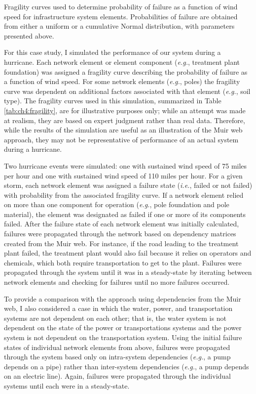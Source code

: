 \begin{table}
\caption[Fragility curves used to determine probability of failure.]{\label{tab:ch4:fragility}Fragility curves used to determine probability of failure as a function of wind speed for infrastructure system elements. Probabilities of failure are obtained from either a uniform or a cumulative Normal distribution, with parameters presented above.}

\end{table}


For this case study, I simulated the performance of our system during a hurricane. Each network element or element component (\emph{e.g.}, treatment plant foundation) was assigned a fragility curve describing the probability of failure as a function of wind speed.  For some network elements (\emph{e.g.}, poles) the fragility curve was dependent on additional factors associated with that element (\emph{e.g.}, soil type).  The fragility curves used in this simulation, summarized in Table \ref{tab:ch4:fragility}, are for illustrative purposes only; while an attempt was made at realism, they are based on expert judgment rather than real data.  Therefore, while the results of the simulation are useful as an illustration of the Muir web approach, they may not be representative of performance of an actual system during a hurricane.

Two hurricane events were simulated: one with sustained wind speed of 75 miles per hour and one with sustained wind speed of 110 miles per hour.  For a given storm, each network element was assigned a failure state (\emph{i.e.}, failed or not failed) with probability from the associated fragility curve.  If a network element relied on more than one component for operation (\emph{e.g.}, pole foundation and pole material), the element was designated as failed if one or more of its components failed.  After the failure state of each network element was initially calculated, failures were propagated through the network based on dependency matrices created from the Muir web.  For instance, if the road leading to the treatment plant failed, the treatment plant would also fail because it relies on operators and chemicals, which both require transportation to get to the plant.  Failures were propagated through the system until it was in a steady-state by iterating between network elements and checking for failures until no more failures occurred.

To provide a comparison with the approach using dependencies from the Muir web, I also considered a case in which the water, power, and transportation systems are not dependent on each other; that is, the water system is not dependent on the state of the power or transportations systems and the power system is not dependent on the transportation system.  Using the initial failure states of individual network elements from above, failures were propagated through the system based only on intra-system dependencies (\emph{e.g.}, a pump depends on a pipe) rather than inter-system dependencies (\emph{e.g.}, a pump depends on an electric line).  Again, failures were propagated through the individual systems until each were in a steady-state.

